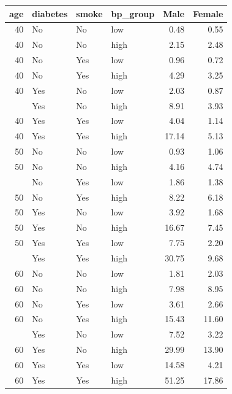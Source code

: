 
\begin{tabular}{rlllrr}
\toprule
age & diabetes & smoke & bp\_group & Male & Female\\
\midrule
40 & No & No & low & 0.48 & 0.55\\
40 & No & No & high & 2.15 & 2.48\\
40 & No & Yes & low & 0.96 & 0.72\\
40 & No & Yes & high & 4.29 & 3.25\\
40 & Yes & No & low & 2.03 & 0.87\\
\addlinespace
40 & Yes & No & high & 8.91 & 3.93\\
40 & Yes & Yes & low & 4.04 & 1.14\\
40 & Yes & Yes & high & 17.14 & 5.13\\
50 & No & No & low & 0.93 & 1.06\\
50 & No & No & high & 4.16 & 4.74\\
\addlinespace
50 & No & Yes & low & 1.86 & 1.38\\
50 & No & Yes & high & 8.22 & 6.18\\
50 & Yes & No & low & 3.92 & 1.68\\
50 & Yes & No & high & 16.67 & 7.45\\
50 & Yes & Yes & low & 7.75 & 2.20\\
\addlinespace
50 & Yes & Yes & high & 30.75 & 9.68\\
60 & No & No & low & 1.81 & 2.03\\
60 & No & No & high & 7.98 & 8.95\\
60 & No & Yes & low & 3.61 & 2.66\\
60 & No & Yes & high & 15.43 & 11.60\\
\addlinespace
60 & Yes & No & low & 7.52 & 3.22\\
60 & Yes & No & high & 29.99 & 13.90\\
60 & Yes & Yes & low & 14.58 & 4.21\\
60 & Yes & Yes & high & 51.25 & 17.86\\
\bottomrule
\end{tabular}